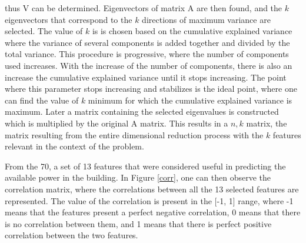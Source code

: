 thus V can be determined. Eigenvectors of matrix A are then found, and the $k$ eigenvectors that correspond to the $k$ directions of maximum variance are selected. The value of $k$ is is chosen based on the cumulative explained variance where the variance of several components is added together and divided by the total variance. This procedure is progressive, where the number of components used increases. With the increase of the number of components, there is also an increase the cumulative explained variance until it stops increasing. The point where this parameter stops increasing and stabilizes is the ideal point, where one can find the value of $k$ minimum for which the cumulative explained variance is maximum. Later a matrix containing the selected eigenvalues is constructed which is multiplied by the original A matrix. This results in a $n,k$ matrix, the matrix resulting from the entire dimensional reduction process with the $k$ features relevant in the context of the problem.






From the 70, a set of 13 features that were considered useful in predicting the available power in the building. In Figure \ref{corr}, one can then observe the correlation matrix, where the correlations between all the 13 selected features are represented. The value of the correlation is present in the [-1, 1] range, where -1 means that the features present a perfect negative correlation, 0 means that there is no correlation between them, and 1 means that there is perfect positive correlation between the two features. 


